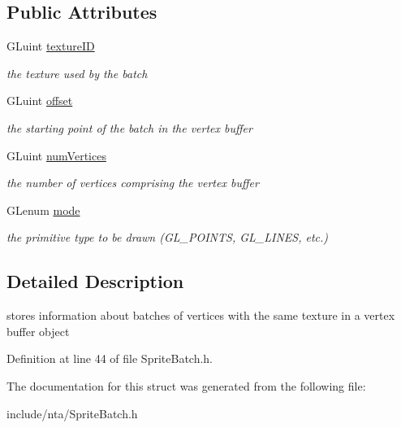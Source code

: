 \subsection*{Public Attributes}
\begin{DoxyCompactItemize}
\item 
\mbox{\label{structnta_1_1RenderBatch_a65aa121e11783396f753c8f937fe9d04}} 
G\+Luint \hyperlink{structnta_1_1RenderBatch_a65aa121e11783396f753c8f937fe9d04}{texture\+ID}
\begin{DoxyCompactList}\small\item\em the texture used by the batch \end{DoxyCompactList}\item 
\mbox{\label{structnta_1_1RenderBatch_ab73ef79a5cbf8b60ad9991eb0a1ea9e6}} 
G\+Luint \hyperlink{structnta_1_1RenderBatch_ab73ef79a5cbf8b60ad9991eb0a1ea9e6}{offset}
\begin{DoxyCompactList}\small\item\em the starting point of the batch in the vertex buffer \end{DoxyCompactList}\item 
\mbox{\label{structnta_1_1RenderBatch_a18e1cb5ff84364540a871db321557b7c}} 
G\+Luint \hyperlink{structnta_1_1RenderBatch_a18e1cb5ff84364540a871db321557b7c}{num\+Vertices}
\begin{DoxyCompactList}\small\item\em the number of vertices comprising the vertex buffer \end{DoxyCompactList}\item 
\mbox{\label{structnta_1_1RenderBatch_ae2cc5e3b2e34aff278ba863443b0fdae}} 
G\+Lenum \hyperlink{structnta_1_1RenderBatch_ae2cc5e3b2e34aff278ba863443b0fdae}{mode}
\begin{DoxyCompactList}\small\item\em the primitive type to be drawn (G\+L\+\_\+\+P\+O\+I\+N\+TS, G\+L\+\_\+\+L\+I\+N\+ES, etc.) \end{DoxyCompactList}\end{DoxyCompactItemize}


\subsection{Detailed Description}
stores information about batches of vertices with the same texture in a vertex buffer object 

Definition at line 44 of file Sprite\+Batch.\+h.



The documentation for this struct was generated from the following file\+:\begin{DoxyCompactItemize}
\item 
include/nta/Sprite\+Batch.\+h\end{DoxyCompactItemize}
